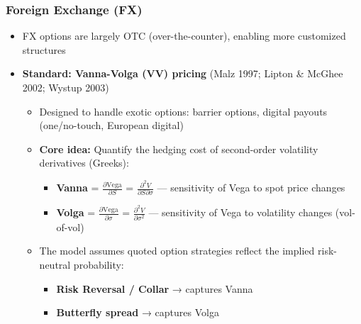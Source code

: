 \documentclass[12pt,openany]{book}
\theoremstyle{definition}
\theoremstyle{remark}
\begin{document}
\subsubsection{Foreign Exchange (FX)}
\begin{itemize}
\item FX options are largely OTC (over-the-counter), enabling more customized structures


\item \textbf{Standard: Vanna-Volga (VV) pricing} (Malz 1997; Lipton \& McGhee 2002; Wystup 2003)

\begin{itemize}
\item Designed to handle exotic options: barrier options, digital payouts (one/no-touch, European digital)


\item \textbf{Core idea:} Quantify the hedging cost of second-order volatility derivatives (Greeks):

\begin{itemize}
\item \textbf{Vanna} = $\frac{\partial \text{Vega}}{\partial S}$ = $\frac{\partial^2 V}{\partial S \partial \sigma}$ --- sensitivity of Vega to spot price changes


\item \textbf{Volga} = $\frac{\partial \text{Vega}}{\partial \sigma}$ = $\frac{\partial^2 V}{\partial \sigma^2}$ --- sensitivity of Vega to volatility changes (vol-of-vol)


\end{itemize}

\item The model assumes quoted option strategies reflect the implied risk-neutral probability:

\begin{itemize}
\item \textbf{Risk Reversal / Collar} → captures Vanna


\item \textbf{Butterfly spread} → captures Volga


\end{itemize}

\end{itemize}

\end{itemize}
\end{document}
